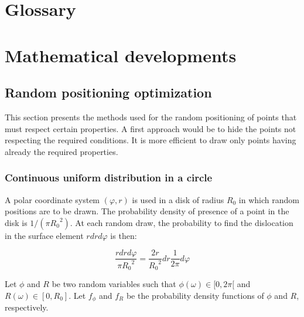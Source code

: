 \nocite{*}

\begin{appendix}

\printbibliography[heading=bibintoc, heading=bibnumbered]

\newpage

\section{Glossary}

\printnoidxglossaries

\newpage

\section{Mathematical developments}

\subsection{Random positioning optimization}

This section presents the methods used for the random positioning of points that must respect certain properties.
A first approach would be to hide the points not respecting the required conditions.
It is more efficient to draw only points having already the required properties.

\subsubsection{Continuous uniform distribution in a circle}\label{sec:circle-random-position}

A polar coordinate system \( (\varphi, r) \) is used in a disk of radius \( R_0 \) in which random positions are to be drawn.
The probability density of presence of a point in the disk is \( 1 / \left( \pi {R_0}^2 \right) \).
At each random draw, the probability to find the dislocation in the surface element \( r dr d\varphi\) is then:

\begin{equation}
  \frac{r dr d\varphi}{\pi {R_0}^2} =
    \frac{2 r}{{R_0}^2} dr \frac{1}{2 \pi} d\varphi
\end{equation}

\bigskip

Let \( \phi \) and \( R \) be two random variables such that \( \phi(\omega) \in [0, 2\pi[ \) and \( R(\omega) \in [0, R_0] \). Let \( f_\phi \) and \( f_R \) be the probability density functions of \( \phi \) and \( R \), respectively.


\end{appendix}
